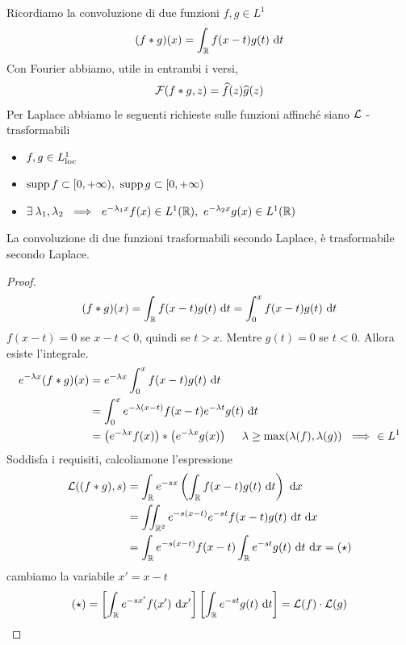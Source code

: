 Ricordiamo la convoluzione di due funzioni $f, g\in L^{1}$
\begin{equation*}
(f*g)(x) = \int_{\mathbb{R}} f(x - t) g(t) \  \mathrm{d} t
\end{equation*}
Con Fourier abbiamo, utile in entrambi i versi,
\begin{equation*}
\mathcal{F}(f*g, z) = \widehat{f}(z)\widehat{g}(z)
\end{equation*}
Per Laplace abbiamo le seguenti richieste sulle funzioni affinché siano $\mathcal{L}$ - trasformabili
\begin{itemize}
\item $f, g\in L^{1}_{\operatorname{loc}}$
\item $\operatorname*{supp} f\subset [0, + \infty), \ \operatorname*{supp} g\subset [0, + \infty)$
\item $\exists \lambda_{1}, \lambda_{2} \ \implies \ e^{- \lambda_{1} x} f(x) \in L^{1}(\RR), \ e^{- \lambda_{2} x} g(x) \in L^{1}(\RR)$
\end{itemize}
\begin{thm}
La convoluzione di due funzioni trasformabili secondo Laplace, è trasformabile secondo Laplace.
\end{thm}
\begin{proof}
\begin{equation*}
(f*g)(x) = \int_{\mathbb{R}} f(x - t) g(t) \  \mathrm{d} t = \int^{x}_{0} f(x - t) g(t) \  \mathrm{d} t
\end{equation*}
$f(x - t) = 0$ se $x - t < 0$, quindi se $t > x$. Mentre $g(t) = 0$ se $t < 0$. Allora esiste l'integrale.
\begin{align*}
e^{- \lambda x}(f*g)(x) & = e^{- \lambda x}\int^{x}_{0} f(x - t) g(t) \dt\\
 & = \int^{x}_{0} e^{- \lambda (x - t)} f(x - t) e^{- \lambda t} g(t) \dt\\
 & = \left(e^{- \lambda x} f(x)\right) *\left(e^{- \lambda x} g(x)\right) \ \ \ \ \lambda \geq \max(\lambda (f), \lambda (g)) \ \implies \ \in L^{1}
\end{align*}
Soddisfa i requisiti, calcoliamone l'espressione
\begin{align*}
\mathcal{L}((f*g), s) & = \int_{\mathbb{R}} e^{- sx}\left(\int_{\mathbb{R}} f(x - t) g(t) \  \mathrm{d} t\right) \  \mathrm{d} x\\
 & = \iint_{\mathbb{R}^{2}} e^{- s(x - t)} e^{- st} f(x - t) g(t) \  \mathrm{d} t\  \mathrm{d} x\\
 & = \int_{\mathbb{R}} e^{- s(x - t)} f(x - t)\int_{\mathbb{R}} e^{- st} g(t) \  \mathrm{d} t\  \mathrm{d} x = (\star)
\end{align*}
cambiamo la variabile $x' = x - t$
\begin{gather*}
(\star) = \left[\int_{\mathbb{R}} e^{- sx'} f(x') \  \mathrm{d} x'\right]\left[\int_{\mathbb{R}} e^{- st} g(t) \  \mathrm{d} t\right] = \mathcal{L}(f) \cdot \mathcal{L}(g)
\end{gather*}
\end{proof}


